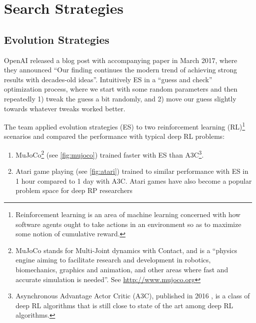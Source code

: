 
\chapter{Search Strategies}
\section{Evolution Strategies} \label{sec:ES}
OpenAI released a blog post \cite{Karpathy} with accompanying paper \cite{Salimans2017} in March 2017, where they announced ``Our finding continues the modern trend of achieving strong results with decades-old ideas''. Intuitively ES in a “guess and check” optimization process, where we start with some random parameters and then repeatedly 1) tweak the guess a bit randomly, and 2) move our guess slightly towards whatever tweaks worked better.

The team applied evolution strategies (ES) to two reinforcement learning (RL)\footnote{Reinforcement learning is an area of machine learning concerned with how software agents ought to take actions in an environment so as to maximize some notion of cumulative reward.} scenarios and compared the performance with typical deep RL problems:

\begin{enumerate}
    \item MuJoCo\footnote{MuJoCo stands for Multi-Joint dynamics with Contact, and is a ``physics engine aiming to facilitate research and development in robotics, biomechanics, graphics and animation, and other areas where fast and accurate simulation is needed''. See \url{http://www.mujoco.org}} (see \cref{fig:mujoco}) trained faster with ES than A3C\footnote{Asynchronous Advantage Actor Critic (A3C), published in 2016 \cite{Mnih2016}, is a class of deep RL algorithms that is still close to state of the art among deep RL algorithms.}.
    \item Atari game playing (see \cref{fig:atari}) trained to similar performance with ES in 1 hour compared to 1 day with A3C. Atari games have also become a popular problem space for deep RP researchers
\end{enumerate}

